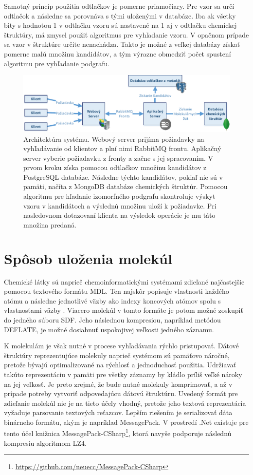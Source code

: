 \documentclass[slovak]{ExcelAtFIT} %
\begin{document}
Samotný princíp použitia odtlačkov je pomerne priamočiary. Pre vzor sa určí odtlačok a následne sa porovnáva s tými uloženými v databáze. Iba ak všetky bity s hodnotou 1 v odtlačku vzoru sú nastavené na 1 aj v odtlačku chemickej štruktúry, má zmysel použiť algoritmus pre vyhľadanie vzoru. V opačnom prípade sa vzor v štruktúre určite nenachádza. Takto je možné z veľkej databázy získať pomerne malú množinu kandidátov, a tým výrazne obmedziť počet spustení algoritmu pre vyhľadanie podgrafu.

\begin{figure}[!htb]
	\centering
	\includegraphics[width=1\linewidth]{images/system.pdf}
	\caption{Architektúra systému. Webový server prijíma požiadavky na vyhľadávanie od klientov a plní nimi RabbitMQ frontu. Aplikačný server vyberie požiadavku z fronty a začne s jej spracovaním. V prvom kroku získa pomocou odtlačkov množinu kandidátov z PostgreSQL databáze. Následne týchto kandidátov, pokiaľ nie sú v pamäti, načíta z MongoDB databáze chemických štruktúr. Pomocou algoritmu pre hľadanie izomorfného podgrafu skontroluje výskyt vzoru v kandidátoch a výslednú množinu uloží k požiadavke. Pri nasledovnom dotazovaní klienta na výsledok operácie je mu táto množina predaná.}
	\label{fig:system}
\end{figure}

\section{Spôsob uloženia molekúl}
\label{sec:storage}
Chemické látky sú naprieč chemoinformatickými sy\-sté\-mami zdieľané najčastejšie pomocou textového for\-má\-tu MDL. Ten najskôr popisuje vlastnosti každého atómu a následne jednotlivé väzby ako indexy koncových atómov spolu s vlastnosťami väzby \cite{mdl}. Viacero molekúl v tomto formáte je potom možné zoskupiť do jedného súboru SDF. Jeho následnou kompresiou, napríklad metódou DEFLATE, je možné dosiahnuť uspokojivej veľkosti jedného záznamu. 

K molekulám je však nutné v procese vyhľadávania rýchlo pristupovať. Dátové štruktúry reprezentujúce molekuly naprieč systémom sú pamäťovo náročné, pretože bývajú optimalizované na rýchlosť a jednoduchosť použitia. Udržiavať takúto reprezentáciu v pamäti pre všetky záznamy by kládlo príliš veľké nároky na jej veľkosť. Je preto zrejmé, že bude nutné molekuly komprimovať, a až v prípade potreby vytvoriť odpovedajúcu dátovú štruktúru. Uvedený formát pre zdieľanie molekúl nie je na tieto účely vhodný, pretože jeho textová reprezentácia vyžaduje parsovanie textových reťazcov. Lepším riešením je serializovať dáta binárneho formátu, akým je napríklad MessagePack. V prostredí .Net existuje pre tento účel knižnica MessagePack-CSharp\footnote{\url{https://github.com/neuecc/MessagePack-CSharp}}, ktorá navyše podporuje následnú kompresiu algoritmom LZ4. 
\end{document}
